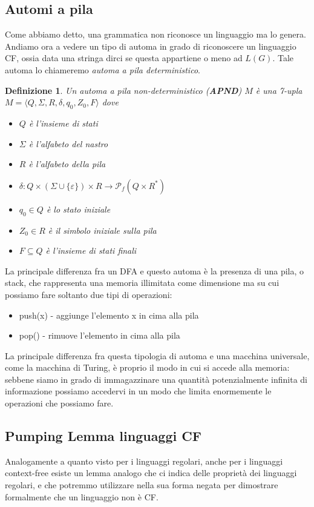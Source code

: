 \documentclass[a4paper,titlepage]{article}
\newtheorem{definition}{Definizione}[section]
\theoremstyle{definition}
\begin{document}
\subsection{Automi a pila}
Come abbiamo detto, una grammatica non riconosce un linguaggio ma lo genera. Andiamo ora a vedere un tipo di automa in grado di riconoscere un linguaggio CF, ossia data una stringa dirci se questa appartiene o meno ad $L(G)$. Tale automa lo chiameremo \textit{automa a pila deterministico}. 
\begin{definition}
	Un automa a pila non-deterministico (\textbf{APND}) $M$ è una 7-upla $M=\langle Q,\Sigma,R,\delta,q_0,Z_0,F\rangle$ dove
	\begin{itemize}
		\item $Q$ è l'insieme di stati
		\item $\Sigma$ è l'alfabeto del nastro
		\item $R$ è l'alfabeto della pila
		\item $\delta: Q\times (\Sigma\cup\{\varepsilon\})\times R\to \mathcal P_f(Q\times R^{*})$
		\item $q_0\in Q$ è lo stato iniziale
		\item $Z_0\in R$ è il simbolo iniziale sulla pila 
		\item $F\subseteq Q$ è l'insieme di stati finali
	\end{itemize}
\end{definition}

La principale differenza fra un DFA e questo automa è la presenza di una pila, o stack, che rappresenta una memoria illimitata come dimensione ma su cui possiamo fare soltanto due tipi di operazioni:
\begin{itemize}
	\item push(x) - aggiunge l'elemento x in cima alla pila 
	\item pop() - rimuove l'elemento in cima alla pila 
\end{itemize}  

La principale differenza fra questa tipologia di automa e una macchina universale, come la macchina di Turing, è proprio il modo in cui si accede alla memoria: sebbene siamo in grado di immagazzinare una quantità potenzialmente infinita di informazione possiamo accedervi in un modo che limita enormemente le operazioni che possiamo fare. 

\subsection{Pumping Lemma linguaggi CF}
Analogamente a quanto visto per i linguaggi regolari, anche per i linguaggi context-free esiste un lemma analogo che ci indica delle proprietà dei linguaggi regolari, e che potremmo utilizzare nella sua forma negata per dimostrare formalmente che un linguaggio non è CF. 
\end{document}
